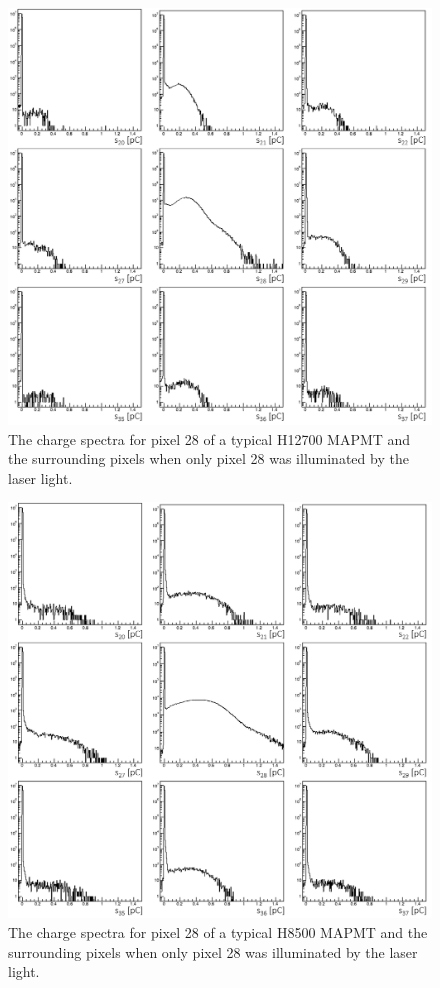 \begin{figure}
	\centering
	\includegraphics[width=0.95\linewidth]{figures/H12700_pixel28_pinhole.png}
	\caption{The charge spectra for pixel 28 of a typical H12700 MAPMT and the surrounding pixels when only pixel 28 was illuminated by the laser light.}
	\label{fig:H12700pinhole}
\end{figure}
\begin{figure}
	\includegraphics[width=0.95\linewidth]{figures/H8500_pixel28_pinhole.png}
	\caption{The charge spectra for pixel 28 of a typical H8500 MAPMT and the surrounding pixels when only pixel 28 was illuminated by the laser light.}
	\label{fig:H8500pinhole}
\end{figure}

